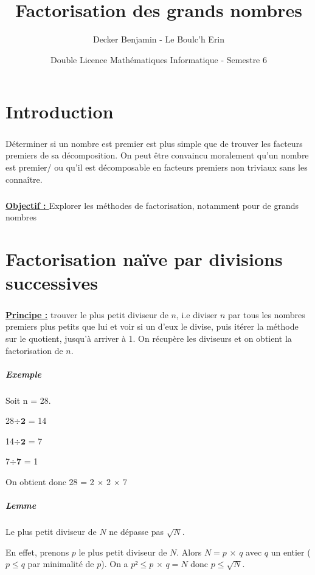 \documentclass[11pt,a4paper]{article}
\begin{document}
	
	\title{Factorisation des grands nombres} 
	\author{Decker Benjamin - Le Boulc'h Erin}
	\date{Double Licence Mathématiques Informatique - Semestre 6}
	\maketitle
	\newpage
	
	\renewcommand*\contentsname{Sommaire}
	\tableofcontents
	\newpage
	
	\section{\LARGE{Introduction}}
	\subparagraph{}
	Déterminer si un nombre est premier est plus simple que de trouver les facteurs premiers de sa décomposition. On peut être convaincu moralement qu’un nombre est premier/ ou qu’il est décomposable en facteurs premiers non triviaux sans les connaître. 
	
	\subparagraph{}
	\textbf{\underline{Objectif : }}Explorer les méthodes de factorisation, notamment pour de grands nombres
	\newpage
		
	\section{\LARGE{Factorisation naïve par divisions successives}}
		\subparagraph{}
	\textbf{\underline{Principe :}} trouver le plus petit diviseur de  $\mathit{n}$, i.e diviser  $\mathit{n}$ par tous les nombres premiers plus petits que lui et voir si un d’eux le divise, puis itérer la méthode sur le quotient, jusqu'à arriver à 1. On récupère les diviseurs et on obtient la factorisation de $\mathit{n}$.
	
		\subparagraph{Exemple}
		Soit n = 28.
		
			28$\div$$\mathbf{2}$ = 14
			
			14$\div$$\mathbf{2}$ = 7
			
			7$\div$$\mathbf{7}$ = 1
			
		On obtient donc 28 = 2 $\times$ 2 $\times$ 7
		
		\subparagraph{Lemme}
		
		Le plus petit diviseur de $\mathit{N}$ ne dépasse pas $\sqrt{N}$.
		
		En effet, prenons $p$ le plus petit diviseur de $\mathit{N}$. Alors $\mathit{N = p}$ $\times$ $\mathit{q}$  avec $q$ un entier ($\mathit{p \leq q}$ par minimalité de $p$). On a $\mathit{p² \leq p}$ $\times$ $\mathit{q = N}$ donc $\mathit{p \leq }$$\sqrt{N}$. 
		
\end{document}
